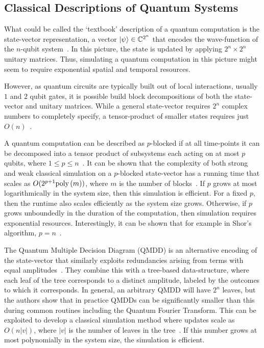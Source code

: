 \subsection{Classical Descriptions of Quantum Systems}\label{sec:intro_classical_desc}
What could be called the `textbook' description of a quantum computation is the state-vector representation, a vector $\ket{\psi}\in\mathbb{C}^{2^{n}}$ that encodes the wave-function of the $n$-qubit system~\cite{Nielsen2000}. In this picture, the state is updated by applying $2^{n}\times 2^{n}$ unitary matrices. Thus, simulating a quantum computation in this picture might seem to require exponential spatial and temporal resources.\par
However, as quantum circuits are typically built out of local interactions, usually $1$ and $2$ qubit gates, it is possible build block decompositions of both the state-vector and unitary matrices. While a general state-vector requires $2^{n}$ complex numbers to completely specify, a tensor-product of smaller states requires just $O\left(n\right)$~\cite{Ekert1998}.\par
A quantum computation can be described as $p$-blocked if at all time-points it can be decomposed into a tensor product of subsystems each acting on at most $p$ qubits, where $1\leq p\leq n$~\cite{Jozsa2003}. It can be shown that the complexity of both strong and weak classical simulation on a $p$-blocked state-vector has a running time that scales as $O(2^{p+1}\text{poly}\left(m\right))$, where $m$ is the number of blocks~\cite{Jozsa2003}. If $p$ grows at most logarithmically in the system size, then this simulation is efficient. For a fixed $p$, then the runtime also scales efficiently as the system size grows. Otherwise, if $p$ grows unboundedly in the duration of the computation, then simulation requires exponential resources. Interestingly, it can be shown that for example in Shor's algorithm, $p=n$~\cite{Ekert1998}.\par
The Quantum Multiple Decision Diagram (QMDD) is an alternative encoding of the state-vector that similarly exploits redundancies arising from terms with equal amplitudes~\cite{Niemann2016}. They combine this with a tree-based data-structure, where each leaf of the tree corresponds to a distinct amplitude, labeled by the outcomes to which it corresponds. In general, an arbitrary QMDD will have $2^{n}$ leaves, but the authors show that in practice QMDDs can be significantly smaller than this during common routines including the Quantum Fourier Transform. This can be exploited to develop a classical simulation method where updates scale as $O\left(n \left|v\right|\right)$, where $\left|v\right|$ is the number of leaves in the tree~\cite{Zulehner2017}. If this number grows at most polynomially in the system size, the simulation is efficient.\par
